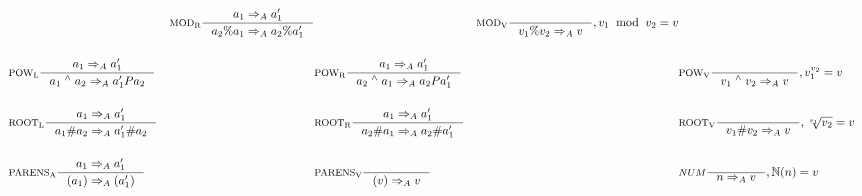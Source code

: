 \begin{align*}
&
&\inference[$\text{MOD}_\text{R}$]{a_1 \Rightarrow_A a_1'}
                    {a_2 \% a_1 \Rightarrow_A a_2 \% a_1'}
&
&\inference[$\text{MOD}_\text{V}$]{}
                    {v_1 \% v_2 \Rightarrow_A v}
										{, v_1 \;\; \textrm{mod} \;\; v_2 = v}
\\\\
&\inference[$\text{POW}_\text{L}$]{a_1  \Rightarrow_A a_1'}
                    {a_1 \; ^\wedge{} \; a_2 \Rightarrow_A a_1' P a_2}
&
&\inference[$\text{POW}_\text{R}$]{a_1 \Rightarrow_A a_1'}
                    {a_2 \; ^\wedge{} \; a_1 \Rightarrow_A a_2 P a_1'}
&
&\inference[$\text{POW}_\text{V}$]{}
                    {v_1 \; ^\wedge{} \; v_2 \Rightarrow_A v}
										{, v_1 ^ {v_2} = v}
\\\\
&\inference[$\text{ROOT}_\text{L}$]{a_1 \Rightarrow_A a_1'}
                    {a_1 \# a_2 \Rightarrow_A a_1' \# a_2}
&
&\inference[$\text{ROOT}_\text{R}$]{a_1 \Rightarrow_A a_1'}
                    {a_2 \# a_1 \Rightarrow_A a_2 \# a_1'}
&
&\inference[$\text{ROOT}_\text{V}$]{}
                    {v_1 \# v_2 \Rightarrow_A v}
										{, \sqrt[v_1]{v_2} = v}
\\\\
&\inference[$\text{PARENS}_\text{A}$]{a_1 \Rightarrow_A a_1'}
                       {(a_1) \Rightarrow_A (a_1')}
&
&\inference[$\text{PARENS}_\text{V}$]{}
                       {(v) \Rightarrow_A v}
&
&\inference[$NUM$]{}
                  {n \Rightarrow_A v}
									{, \mathbb{N}(n) = v}
\end{align*}

